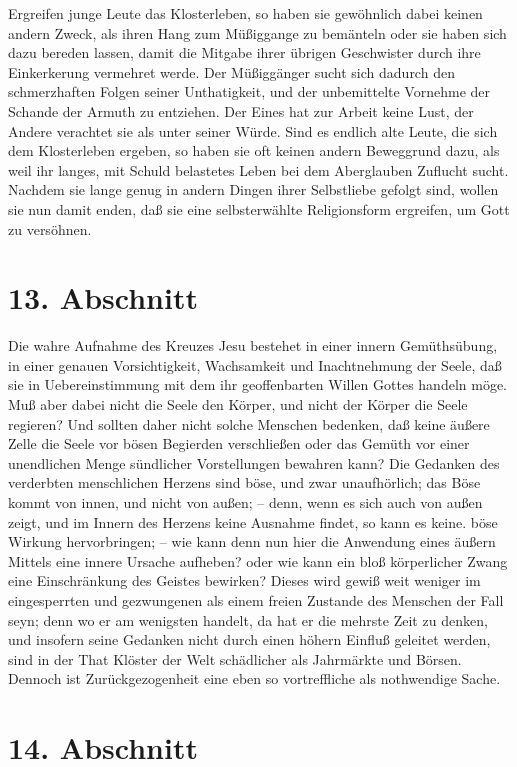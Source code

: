 Ergreifen junge Leute das Klosterleben, so haben sie gewöhnlich dabei keinen andern Zweck, als ihren Hang zum Müßiggange zu bemänteln oder sie haben sich dazu bereden lassen, damit die Mitgabe ihrer übrigen Geschwister durch ihre Einkerkerung vermehret werde. Der Müßiggänger sucht sich dadurch den schmerzhaften Folgen seiner Unthatigkeit, und der unbemittelte Vornehme der Schande der Armuth zu entziehen. Der Eines hat zur Arbeit keine Lust, der Andere verachtet sie als unter seiner Würde. Sind es endlich alte Leute, die sich dem Klosterleben ergeben, so haben sie oft keinen andern Beweggrund dazu, als weil ihr langes, mit Schuld belastetes Leben bei dem Aberglauben Zuflucht sucht. Nachdem sie lange genug in andern Dingen ihrer Selbstliebe gefolgt sind, wollen sie nun damit enden, daß sie eine selbsterwählte Religionsform ergreifen, um Gott zu versöhnen.

\section{13. Abschnitt}

Die wahre Aufnahme des Kreuzes Jesu bestehet in einer innern Gemüthsübung, in einer genauen Vorsichtigkeit, Wachsamkeit und Inachtnehmung der Seele, daß sie in Uebereinstimmung mit dem ihr geoffenbarten Willen Gottes handeln möge. Muß aber dabei nicht die Seele den Körper, und nicht der Körper die Seele regieren? Und sollten daher nicht solche Menschen bedenken, daß keine äußere Zelle die Seele vor bösen Begierden verschließen oder das Gemüth vor einer unendlichen Menge sündlicher Vorstellungen bewahren kann? Die Gedanken des verderbten menschlichen Herzens sind böse, und zwar unaufhörlich; das Böse kommt von innen, und nicht von außen; -- denn, wenn es sich auch von außen zeigt, und im Innern des Herzens keine Ausnahme findet, so kann es keine. böse Wirkung hervorbringen; -- wie kann denn nun hier die Anwendung eines äußern Mittels eine innere Ursache aufheben? oder wie kann ein bloß körperlicher Zwang eine Einschränkung des Geistes bewirken? Dieses wird gewiß weit weniger im eingesperrten und gezwungenen als einem freien Zustande des Menschen der Fall seyn; denn wo er am wenigsten handelt, da hat er die mehrste Zeit zu denken, und insofern seine Gedanken nicht durch einen höhern Einfluß geleitet werden, sind in der That Klöster der Welt schädlicher als Jahrmärkte und Börsen. Dennoch ist Zurückgezogenheit eine eben so vortreffliche als nothwendige Sache.

\section{14. Abschnitt}

